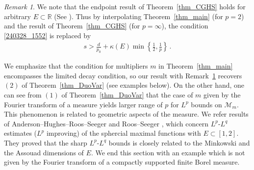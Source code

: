 \documentclass[11pt]{amsart}
\theoremstyle{plain}
\theoremstyle{definition}
\theoremstyle{remark}
\newtheorem{remark}{Remark}
\numberwithin{equation}{section}
\newcommand{\bR}{\mathbb{R}}
\begin{document}
\begin{remark}\label{rmk_main}
    We note that the endpoint result of Theorem~\ref{thm_CGHS} holds for arbitrary $E\subset\bR$ (See \cite[Corollary 4.2 and (4.16)]{Ch_Gr_Hon_See2005}).
    Thus by interpolating Theorem~\ref{thm_main} (for $p=2$) and the result of Theorem~\ref{thm_CGHS} (for $p=\infty$), the condition \eqref{240328_1552} is replaced by
    \begin{align*}
        s>\frac{d}{p_0} + \kappa(E)\min\left\{\frac{1}{2}, \frac{1}{p}\right\}\,.
    \end{align*}
\end{remark}

We emphasize that the condition for multipliers $m$ in Theorem~\ref{thm_main} encompasses the limited decay condition, so our result with Remark~\ref{rmk_main} recovers $(2)$ of Theorem~\ref{thm_DuoVar} (see examples below).  
On the other hand, one can see from $(1)$ of Theorem~\ref{thm_DuoVar} that the case of $m$ given by the Fourier transform of a measure yields larger range of $p$ for $L^p$ bounds on $\mathcal{M}_m$.
This phenomenon is related to geometric aspects of the measure.
We refer results of Anderson--Hughes--Roos--Seeger \cite{AHRS2021} and Roos--Seeger \cite{RoSe2023}, which concern $L^p$-$L^q$ estimates ($L^p$ improving) of the sphercial maximal functions with $E\subset[1,2]$.
They proved that the sharp $L^p$-$L^q$ bounds is closely related to the Minkowski and the Assouad dimensions of $E$.
We end this section with an example which is not given by the Fourier transform of a compactly supported finite Borel measure.
\end{document}
